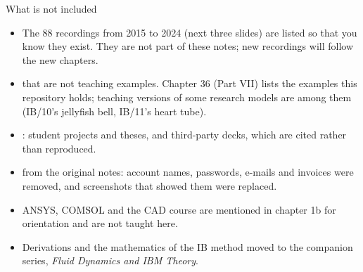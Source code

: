 \documentclass[aspectratio=169,11pt]{beamer}
\begin{document}
\begin{frame}{What is not included}
\begin{itemize}
  \item {} The 88 recordings from 2015 to 2024 (next three slides) are listed so that you know they exist. They are not part of these notes; new recordings will follow the new chapters.
  \item {} that are not teaching examples. Chapter 36 (Part VII) lists the examples this repository holds; teaching versions of some research models are among them (IB/10's jellyfish bell, IB/11's heart tube).
  \item {}: student projects and theses, and third-party decks, which are cited rather than reproduced.
  \item {} from the original notes: account names, passwords, e-mails and invoices were removed, and screenshots that showed them were replaced.
  \item {} ANSYS, COMSOL and the CAD course are mentioned in chapter 1b for orientation and are not taught here.
  \item {} Derivations and the mathematics of the IB method moved to the companion series, \emph{Fluid Dynamics and IBM Theory}.
\end{itemize}
\end{frame}


\end{document}
